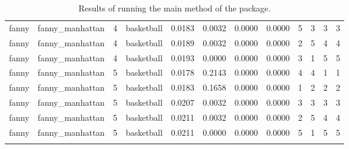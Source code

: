 \documentclass[
]{article}
\begin{document}
\begin{longtable}{| p{1.1cm} | p{2cm} | p{0.8cm} | p{1.3cm} | p{0.60cm} | p{0.7cm} | p{0.65cm} | p{0.65cm} | p{0.65cm} | p{0.65cm} | p{0.7cm} | p{0.65cm} |}
\scriptsize   fanny   & \scriptsize  fanny\_manhattan & \scriptsize    4    & \scriptsize basketball & \scriptsize    0.0183  &  \scriptsize 0.0032 & \scriptsize 0.0000 & \scriptsize    0.0000 & \scriptsize   5  & \scriptsize    3  & \scriptsize    3  & \scriptsize    3 \\
\scriptsize   fanny   & \scriptsize  fanny\_manhattan & \scriptsize    4    & \scriptsize basketball & \scriptsize    0.0189  &  \scriptsize 0.0032 & \scriptsize 0.0000 & \scriptsize    0.0000 & \scriptsize   2  & \scriptsize    5  & \scriptsize    4  & \scriptsize    4 \\
\scriptsize   fanny   & \scriptsize  fanny\_manhattan & \scriptsize    4    & \scriptsize basketball & \scriptsize    0.0193  &  \scriptsize 0.0000 & \scriptsize 0.0000 & \scriptsize    0.0000 & \scriptsize   3  & \scriptsize    1  & \scriptsize    5  & \scriptsize    5 \\
\cline{3-12}
\scriptsize   fanny   & \scriptsize  fanny\_manhattan & \scriptsize    5    & \scriptsize basketball & \scriptsize    0.0178  &  \scriptsize 0.2143 & \scriptsize 0.0000 & \scriptsize    0.0000 & \scriptsize   4  & \scriptsize    4  & \scriptsize    1  & \scriptsize    1 \\
\scriptsize   fanny   & \scriptsize  fanny\_manhattan & \scriptsize    5    & \scriptsize basketball & \scriptsize    0.0183  &  \scriptsize 0.1658 & \scriptsize 0.0000 & \scriptsize    0.0000 & \scriptsize   1  & \scriptsize    2  & \scriptsize    2  & \scriptsize    2 \\
\scriptsize   fanny   & \scriptsize  fanny\_manhattan & \scriptsize    5    & \scriptsize basketball & \scriptsize    0.0207  &  \scriptsize 0.0032 & \scriptsize 0.0000 & \scriptsize    0.0000 & \scriptsize   3  & \scriptsize    3  & \scriptsize    3  & \scriptsize    3 \\
\scriptsize   fanny   & \scriptsize  fanny\_manhattan & \scriptsize    5    & \scriptsize basketball & \scriptsize    0.0211  &  \scriptsize 0.0032 & \scriptsize 0.0000 & \scriptsize    0.0000 & \scriptsize   2  & \scriptsize    5  & \scriptsize    4  & \scriptsize    4 \\
\scriptsize   fanny   & \scriptsize  fanny\_manhattan & \scriptsize    5    & \scriptsize basketball & \scriptsize    0.0211  &  \scriptsize 0.0000 & \scriptsize 0.0000 & \scriptsize    0.0000 & \scriptsize   5  & \scriptsize    1  & \scriptsize    5  & \scriptsize    5 \\
\hline
\caption{Results of running the main method of the package.}
\label{tab:clustering}
\end{longtable}
\end{document}
